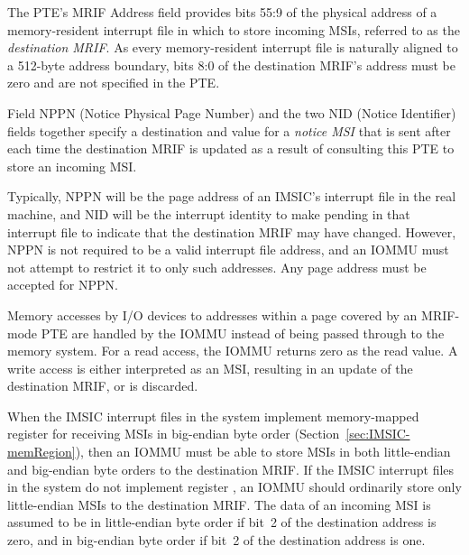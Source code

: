 The PTE's MRIF Address field provides bits 55:9 of the physical address
of a memory-resident interrupt file in which to store incoming MSIs,
referred to as the \emph{destination MRIF}.
As every memory-resident interrupt file is naturally aligned to a
\mbox{512-byte} address boundary, bits 8:0 of the destination MRIF's
address must be zero and are not specified in the PTE.

Field NPPN (Notice Physical Page Number) and the two NID
(Notice Identifier) fields together specify a destination and value for
a \emph{notice MSI} that is sent after each time the destination MRIF
is updated as a result of consulting this PTE to store an incoming MSI.

\begin{commentary}
Typically, NPPN will be the page address of an IMSIC's interrupt file
in the real machine, and NID will be the interrupt identity to make
pending in that interrupt file to indicate that the destination MRIF
may have changed.
However, NPPN is not required to be a valid interrupt file address, and
an \mbox{IOMMU} must not attempt to restrict it to only such addresses.
Any page address must be accepted for NPPN.
\end{commentary}

Memory accesses by I/O devices to addresses within a page
covered by an MRIF-mode PTE are handled by the IOMMU
instead of being passed through to the memory system.
For a read access, the IOMMU returns zero as the read value.
A write access is either interpreted as an MSI, resulting
in an update of the destination MRIF, or is discarded.

When the IMSIC interrupt files in the system implement memory-mapped
register  for receiving MSIs in big-endian byte order
(Section~\ref{sec:IMSIC-memRegion}), then an \mbox{IOMMU} must be able to
store MSIs in both little-endian and big-endian byte orders to the
destination MRIF.
If the IMSIC interrupt files in the system do not implement
register , an \mbox{IOMMU} should ordinarily store only
little-endian MSIs to the destination MRIF.
The data of an incoming MSI is assumed to be in little-endian byte
order if bit~2 of the destination address is zero, and in big-endian
byte order if bit~2 of the destination address is one.

